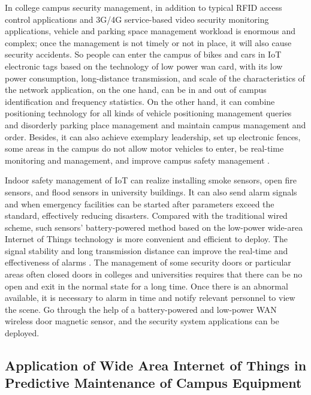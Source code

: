 \documentclass[conference]{IEEEtran}
\begin{document}
In college campus security management, in addition to typical RFID access control applications and 3G/4G service-based video security monitoring applications, vehicle and parking space management workload is enormous and complex; once the management is not timely or not in place, it will also cause security accidents. So people can enter the campus of bikes and cars in IoT electronic tags based on the technology of low power wan card, with its low power consumption, long-distance transmission, and scale of the characteristics of the network application, on the one hand, can be in and out of campus identification and frequency statistics. On the other hand, it can combine positioning technology for all kinds of vehicle positioning management queries and disorderly parking place management and maintain campus management and order. Besides, it can also achieve exemplary leadership, set up electronic fences, some areas in the campus do not allow motor vehicles to enter, be real-time monitoring and management, and improve campus safety management \cite{INTCAMPUS:ResearchOnWideCoverage}.

Indoor safety management of IoT can realize installing smoke sensors, open fire sensors, and flood sensors in university buildings. It can also send alarm signals and when emergency facilities can be started after parameters exceed the standard, effectively reducing disasters. Compared with the traditional wired scheme, such sensors' battery-powered method based on the low-power wide-area Internet of Things technology is more convenient and efficient to deploy. The signal stability and long transmission distance can improve the real-time and effectiveness of alarms \cite{INTCAMPUS:AppofIOTinSmartCampus}. The management of some security doors or particular areas often closed doors in colleges and universities requires that there can be no open and exit in the normal state for a long time. Once there is an abnormal available, it is necessary to alarm in time and notify relevant personnel to view the scene. Go through the help of a battery-powered and low-power WAN wireless door magnetic sensor, and the security system applications can be deployed.

\subsection{Application of Wide Area Internet of Things in Predictive Maintenance of Campus Equipment}
\end{document}
